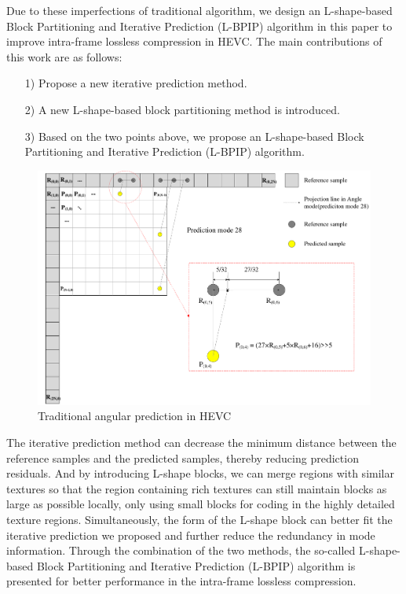 \documentclass[journal]{IEEEtran}
\begin{document}
Due to these imperfections of traditional algorithm, we design an L-shape-based Block Partitioning and Iterative Prediction (L-BPIP) algorithm in this paper to improve intra-frame lossless compression in HEVC. The main contributions of this work are as follows:

\begin{itemize}
    \item [1)]
          Propose a new iterative prediction method.
    \item [2)]
          A new L-shape-based block partitioning method is introduced.
    \item [3)]
          Based on the two points above, we propose an L-shape-based Block Partitioning and Iterative Prediction (L-BPIP) algorithm.
\end{itemize}

\begin{figure}[tp]
    \centering
    \includegraphics[width=14cm]{pictures/HEVCprediction.pdf}
    \caption{Traditional angular prediction in HEVC}
    \label{fig:HEVCprediction}
\end{figure}

The iterative prediction method can decrease the minimum distance between the reference samples and the predicted samples, thereby reducing prediction residuals. And by introducing L-shape blocks, we can merge regions with similar textures so that the region containing rich textures can still maintain blocks as large as possible locally, only using small blocks for coding in the highly detailed texture regions. Simultaneously, the form of the L-shape block can better fit the iterative prediction we proposed and further reduce the redundancy in mode information. Through the combination of the two methods, the so-called L-shape-based Block Partitioning and Iterative Prediction (L-BPIP) algorithm is presented for better performance in the intra-frame lossless compression.
\end{document}
